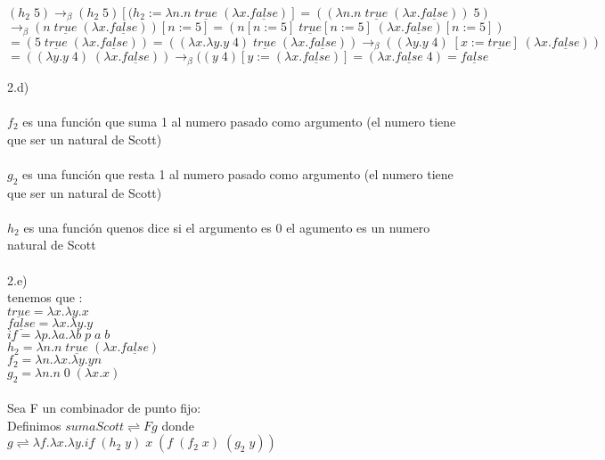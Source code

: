 \documentclass{article}
\begin{document}
\begin{flushleft}
	\[(h_{2} \;5) \rightarrow_{\beta} (h_{2} \;5) [(h_{2} := \lambda n.n  \; \underline {true} \;(\lambda x.  \underline {false})]  =( ( \lambda n.n  \; \underline {true} \;(\lambda x.  \underline 		{false})) \;5 )\]
	\[ \rightarrow_{\beta}(n  \; \underline {true} \;(\lambda x.  \underline {false}))[n := 5] = (n[n := 5]   \; \underline {true}[n := 5]  \;(\lambda x.  \underline {false})[n := 5] )\]
	\[ = (5  \; \underline {true} \;(\lambda x.  \underline {false})) =( (\lambda x.\lambda y. y\; 4)\; \underline {true}  \;(\lambda x.  \underline {false}))  \rightarrow_{\beta} ( (\lambda y. y \; 4)\; 		[x:= \underline {true} ] \;(\lambda x.  \underline {false})) \]
	\[=((\lambda y. y \; 4)\; (\lambda x.  \underline {false})) \rightarrow_{\beta} ((y \; 4)[y :=   (\lambda x.  \underline {false})] = (\lambda x.  \underline {false} \; 4) = \underline {false}\]

	2.d) \\ \ \\
	$f_{2}$ es una función que suma 1 al numero pasado como argumento (el numero tiene que ser  un natural de Scott) \\ \ \\
	$g_{2}$ es una función que resta 1 al numero pasado como argumento (el numero tiene que ser  un natural de Scott) \\ \ \\
	$h_{2}$ es una función quenos dice si el argumento es 0 el agumento es un numero natural de Scott\\ \ \\

	2.e)\\ 
	tenemos que : \\
	$\underline {true} =  \lambda x. \lambda y . x$\\ 
	$\underline {false} =  \lambda x. \lambda y . y$\\ 
	$\underline {if} =  \lambda p . \lambda a. \lambda b \; p \; a \; b$ \\
	$h_{2}  = \lambda n.n  \; \underline {true} \;(\lambda x.  \underline {false})$\\
	$f_{2} = \lambda n.\lambda x.\lambda y. y n$\\
	$g_{2} = \lambda n.n \;0 \;(\lambda x.x)$\\ \ \\
	
	Sea F un combinador de punto fijo:\\
	Definimos $ sumaScott \rightleftharpoons Fg $ donde \\
	$ g \rightleftharpoons \lambda f . \lambda x . \lambda y. \underline {if} \; (h_{2}\; y )  \; x \; ( f \; ( f_{2} \; x ) \; (g_{2} \; y )) $
	
	\end{flushleft}
\end{document}
